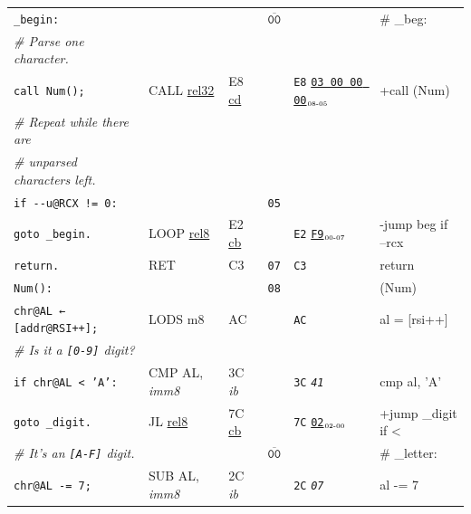 \documentclass[a4paper,12pt,final]{article}
\begin{document}
\begin{table}[!htbp]
\begin{adjustwidth}{-1cm}{-1cm}
\begin{center}
\begin{tabular}{l|ll|l|lH}
\texttt{\_begin:} &  &  & \(\overline{\texttt{00}}\) &  & \# \_beg:\\[0pt]
\hspace{1.053000em} \emph{\# Parse one character.} &  &  &  &  & \\[0pt]
\hspace{1.053000em} \texttt{call Num();} & CALL \uline{rel32} & E8 \uline{cd} &  & \texttt{E8} \uline{\texttt{03 00 00 00}}​\(_{\text{\tiny 08-05}}\) & +call (Num)\\[0pt]
\hspace{1.053000em} \emph{\# Repeat while there are} &  &  &  &  & \\[0pt]
\hspace{1.053000em} \emph{\# unparsed characters left.} &  &  &  &  & \\[0pt]
\hspace{1.053000em} \texttt{if -{}-{}u@RCX != 0:} &  &  & \texttt{05} &  & \\[0pt]
\hspace{2.106000em}   \texttt{goto \_begin.} & LOOP \uline{rel8} & E2 \uline{cb} &  & \texttt{E2} \uline{\texttt{F9}}​\(_{\text{\tiny 00-07}}\) & -jump beg if --rcx\\[0pt]
\hspace{1.053000em} \texttt{return.} & RET & C3 & \texttt{07} & \texttt{C3} & return\\[0pt]
\texttt{Num():} &  &  & \texttt{08} &  & (Num)\\[0pt]
\hspace{1.053000em} \texttt{chr@AL ← [addr@RSI++];} & LODS m8 & AC &  & \texttt{AC} & al = [rsi++]\\[0pt]
\hspace{1.053000em} \emph{\# Is it a \texttt{[0-9]} digit?} &  &  &  &  & \\[0pt]
\hspace{1.053000em} \texttt{if chr@AL < 'A':} & CMP AL, \emph{imm8} & 3C \emph{ib} &  & \texttt{3C} \emph{\texttt{41}} & cmp al, 'A'\\[0pt]
\hspace{2.106000em}   \texttt{goto \_digit.} & JL \uline{rel8} & 7C \uline{cb} &  & \texttt{7C} \uline{\texttt{02}}​\(_{\text{\tiny 02-00}}\) & +jump \_digit if <\\[0pt]
\hspace{1.053000em} \emph{\# It's an \texttt{[A-F]} digit.} &  &  & \(\overline{\texttt{00}}\) &  & \# \_letter:\\[0pt]
\hspace{1.053000em} \texttt{chr@AL -= 7;} & SUB AL, \emph{imm8} & 2C \emph{ib} &  & \texttt{2C} \emph{\texttt{07}} & al -= 7\\[0pt]

\end{tabular}
\end{center}
\end{adjustwidth}
\end{table}
\end{document}
